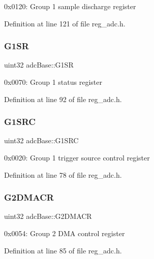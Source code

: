 0x0120\+: Group 1 sample discharge register 

Definition at line 121 of file reg\+\_\+adc.\+h.

\mbox{\label{structadcBase_a4b315d87ee4ab0e865e0a83bc65cc043}} 
\subsubsection{\texorpdfstring{G1\+SR}{G1SR}}
{\footnotesize\ttfamily uint32 adc\+Base\+::\+G1\+SR}

0x0070\+: Group 1 status register 

Definition at line 92 of file reg\+\_\+adc.\+h.

\mbox{\label{structadcBase_a3865444918614fe8b7ffee5dd20a92af}} 
\subsubsection{\texorpdfstring{G1\+S\+RC}{G1SRC}}
{\footnotesize\ttfamily uint32 adc\+Base\+::\+G1\+S\+RC}

0x0020\+: Group 1 trigger source control register 

Definition at line 78 of file reg\+\_\+adc.\+h.

\mbox{\label{structadcBase_a3e1813e77419560cb49993375ca47550}} 
\subsubsection{\texorpdfstring{G2\+D\+M\+A\+CR}{G2DMACR}}
{\footnotesize\ttfamily uint32 adc\+Base\+::\+G2\+D\+M\+A\+CR}

0x0054\+: Group 2 D\+MA control register 

Definition at line 85 of file reg\+\_\+adc.\+h.

\mbox{\label{structadcBase_a64642efc2681b98bebfaffbc22d90e52}} 
